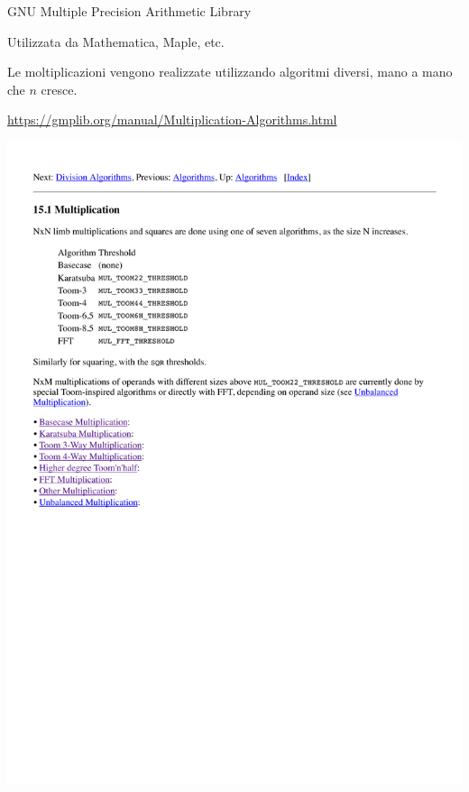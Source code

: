 \begin{frame}{GNU Multiple Precision Arithmetic Library}

\BI
\item Utilizzata da Mathematica, Maple, etc.
\item Le moltiplicazioni vengono realizzate utilizzando algoritmi diversi,
mano a mano che $n$ cresce.
\item \url{https://gmplib.org/manual/Multiplication-Algorithms.html}
\EI

\medskip
\includegraphics[width=\textwidth]{gmp.pdf}

\end{frame}


